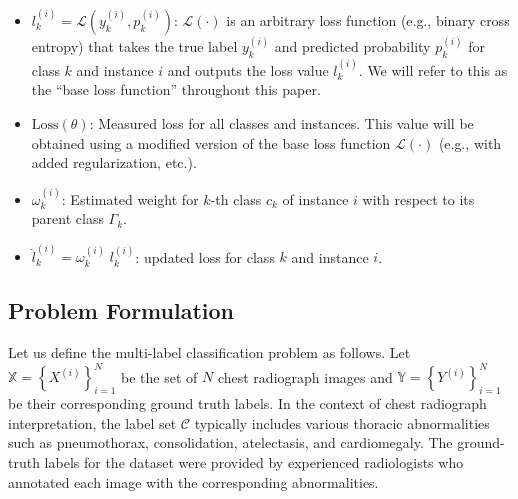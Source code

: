 \begin{itemize}

    \item  $l_k^{(i)} = \mathcal{L} \left(y_k^{(i)},p_k^{(i)}\right) $:  $\mathcal{L}(\cdot)$ is an arbitrary loss function (e.g., binary cross entropy) that takes the true label $y_k^{(i)}$ and predicted probability $p_k^{(i)}$ for class $k$ and instance $i$ and outputs the loss value $l_k^{(i)} $. We will refer to this as the ``base loss function'' throughout this paper.

    \item  $\text{Loss}(\theta) $: Measured loss for all classes and instances. This value will be obtained using a modified version of the base loss function $\mathcal{L}(\cdot) $ (e.g., with added regularization, etc.).

    \item  $\omega_k^{(i)} $: Estimated weight for $k$-th class $c_k $ of instance $i $ with respect to its parent class $\Gamma_k $.

    \item  ${\widehat l}_k^{(i)} = \omega_k^{(i)} \; l_k^{(i)} $: updated loss for class $k $ and instance $i $.


\end{itemize}

\subsection{Problem Formulation}\label{subsec:problem-formulation}
Let us define the multi-label classification problem as follows. Let $\mathbb{X} = {\left\{X^{(i)}\right\}}_{i=1}^{N} $ be the set of $N $ chest radiograph images and $\mathbb{Y} = {\left\{Y^{(i)}\right\}}_{i=1}^{N} $ be their corresponding ground truth labels. In the context of chest radiograph interpretation, the label set $\mathcal{C} $ typically includes various thoracic abnormalities such as pneumothorax, consolidation, atelectasis, and cardiomegaly. The ground-truth labels for the dataset were provided by experienced radiologists who annotated each image with the corresponding abnormalities.

